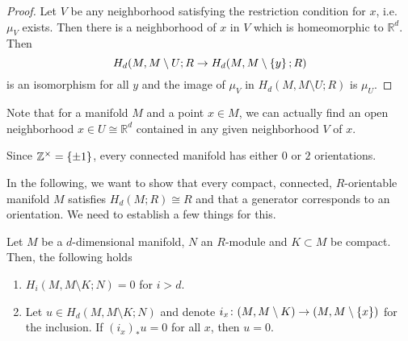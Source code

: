 \begin{proof}
  Let $V$ be any neighborhood satisfying
  the restriction condition for $x$, i.e.~$\mu_V$ exists.
  Then there is a neighborhood of $x$ in $V$ which is homeomorphic
  to $\mathbb{R}^d$.
  Then
  \[
    H_d(M, M\setminus U;R \to H_d(M, M\setminus \left\{  y  \right\} ;R)
  \]
  is an isomorphism for all $y$ and the image of  $\mu_V$
  in  $H_d(M, M\setminus U;R)$ is $\mu_U$.
\end{proof}

\begin{oral}
  Note that for a manifold $M$ and a point  $x\in M$,
  we can actually find an open neighborhood $x\in U \cong \mathbb{R}^d$
  contained in any given neighborhood $V$ of  $x$.
\end{oral}

\begin{example}
  Since $\mathbb{Z}^{\times} = \left\{  \pm 1  \right\} $,
  every connected manifold has either $0$ or  $2$ orientations.
\end{example}

In the following,
we want to show that every compact, connected,
$R$-orientable manifold $M$ satisfies
$H_d(M;R) \cong R$ and that a generator corresponds
to an orientation.
We need to establish a few things for this.

\begin{lemma}
  \label{lm:top-homology-of-manifold-relative-to-cocompact-subset}
  Let $M$ be a $d$-dimensional manifold, $N$ an  $R$-module
  and  $K\subset M$ be compact.
  Then, the following holds
  \begin{enumerate}[h]
    \item $H_i(M, M\setminus K ; N) = 0$ for $i>d$.
    \item Let $u\in H_d(M, M \setminus K;N)$ and denote
      $i_x\colon (M, M \setminus K) \to  (M, M \setminus \left\{  x  \right\} )$
      for the inclusion.
      If $(i_x)_* u = 0$ for all  $x$, then $u=0$.
  \end{enumerate}
\end{lemma}

